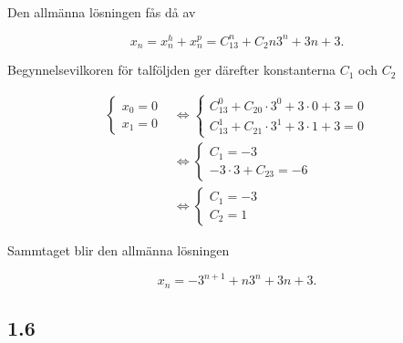 \documentclass[a4paper]{article}
\begin{document}
Den allmänna lösningen fås då av

\begin{equation*}
	x_n = x_n^h + x_n^p = C_13^n + C_2n3^n + 3n + 3.
\end{equation*}

Begynnelsevilkoren för talföljden ger därefter konstanterna $C_1$ och $C_2$

\begin{align*}
	\begin{cases}
		x_0 = 0\\
		x_1 = 0
	\end{cases}
	&\iff
	\begin{cases}
		C_13^0 + C_20\cdot3^0 + 3\cdot 0 + 3 = 0\\
		C_13^1 + C_21\cdot3^1 + 3\cdot 1 + 3 = 0
	\end{cases}\\
	&\iff
	\begin{cases}
		C_1 = -3\\
		-3\cdot 3 + C_23 = -6
	\end{cases}\\
	&\iff
	\begin{cases}
		C_1 = -3\\
		C_2 = 1
	\end{cases}
\end{align*}

Sammtaget blir den allmänna lösningen

\begin{equation*}
	x_n = -3^{n+1} + n3^n + 3n + 3.
\end{equation*}

\subsection*{1.6}



	
\end{document}
